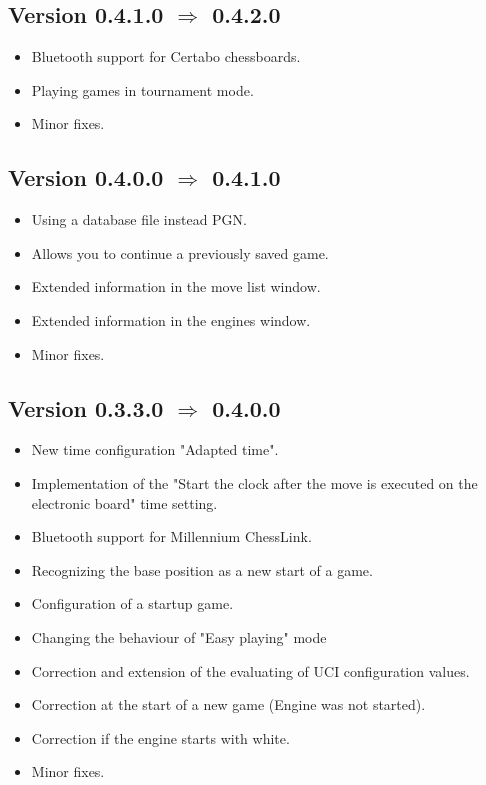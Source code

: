 \documentclass[11pt,a4paper]{article}
\begin{document}
\subsection*{Version 0.4.1.0  $\Rightarrow$  0.4.2.0}
\begin{itemize}
	\item Bluetooth support for Certabo chessboards.
	\item Playing games in tournament mode.
	\item Minor fixes.	
\end{itemize}

\subsection*{Version 0.4.0.0  $\Rightarrow$  0.4.1.0}
\begin{itemize}
	\item Using a database file instead PGN.
	\item Allows you to continue a previously saved game.
	\item Extended information in the move list window.
    \item Extended information in the engines window.
	\item Minor fixes.	
\end{itemize}

\subsection*{Version 0.3.3.0  $\Rightarrow$  0.4.0.0}
\begin{itemize}
	\item New time configuration "Adapted time".
	\item Implementation of the "Start the clock after the move is executed on the electronic board" time setting.
    \item Bluetooth support for Millennium ChessLink.
	\item Recognizing the base position as a new start of a game.
	\item Configuration of a startup game.
	\item Changing the behaviour of "Easy playing" mode
	\item Correction and extension of the evaluating of UCI configuration values.
	\item Correction at the start of a new game (Engine was not started).
	\item Correction if the engine starts with white.
	\item Minor fixes.	
\end{itemize}
\end{document}
